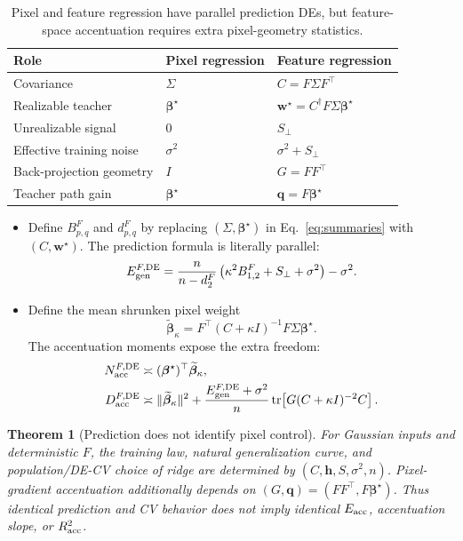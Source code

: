 \documentclass{article}
\newtheorem{theorem}{Theorem}
\providecommand{\tr}{\operatorname{tr}}
\newcommand{\bstar}{\bm\beta^{\star}}
\newcommand{\tstar}{\bm w^{\star}}
\newcommand{\Egen}{E_{\rm gen}}
\newcommand{\Eacc}{E_{\rm acc}}
\newcommand{\Racc}{R_{\rm acc}^{2}}
\newcommand{\Sperp}{S_{\perp}}
\begin{document}
\begin{table}[t]
\caption{Pixel and feature regression have parallel prediction DEs, but
feature-space accentuation requires extra pixel-geometry statistics.}
\label{tab:parallel}
\centering
\small
\begin{tabular}{@{}lll@{}}
\toprule
Role & Pixel regression & Feature regression \\
\midrule
Covariance & $\Sigma$ & $C=F\Sigma F^\top$ \\
Realizable teacher & $\bstar$ & $\tstar=C^\dagger F\Sigma\bstar$ \\
Unrealizable signal & $0$ & $\Sperp$ \\
Effective training noise & $\sigma^2$ & $\sigma^2+\Sperp$ \\
Back-projection geometry & $I$ & $G=FF^\top$ \\
Teacher path gain & $\bstar$ & $\bm q=F\bstar$ \\
\bottomrule
\end{tabular}
\end{table}

\begin{itemize}[leftmargin=1.3em]
  \item Define $B^F_{p,q}$ and $d^F_{p,q}$ by replacing
        $(\Sigma,\bstar)$ in Eq.~\eqref{eq:summaries} with $(C,\tstar)$.
        The prediction formula is literally parallel:
  \begin{equation}
    \Egen^{F,{\rm DE}}
    =\frac{n}{n-d_2^F}
      \left(\kappa^2B^F_{1,2}+\Sperp+\sigma^2\right)-\sigma^2.
    \label{eq:feature-egen}
  \end{equation}
  \item Define the mean shrunken pixel weight
  \begin{equation}
    \widetilde{\bm\beta}_\kappa
    =F^\top(C+\kappa I)^{-1}F\Sigma\bstar.
    \label{eq:betatilde}
  \end{equation}
  The accentuation moments expose the extra freedom:
  \begin{align}
    N_{\rm acc}^{F,{\rm DE}}
    &\asymp (\bstar)^\top\widetilde{\bm\beta}_\kappa,
    \label{eq:feature-n}\\
    D_{\rm acc}^{F,{\rm DE}}
    &\asymp \lVert\widetilde{\bm\beta}_\kappa\rVert^2
    +\frac{\Egen^{F,{\rm DE}}+\sigma^2}{n}
      \tr\!\left[G(C+\kappa I)^{-2}C\right].
    \label{eq:feature-d}
  \end{align}
\end{itemize}

\begin{theorem}[Prediction does not identify pixel control]
\label{thm:separation}
For Gaussian inputs and deterministic $F$, the training law, natural
generalization curve, and population/DE-CV choice of ridge are determined by
$(C,\bm h,S,\sigma^2,n)$. Pixel-gradient accentuation additionally depends on
$(G,\bm q)=(FF^\top,F\bstar)$. Thus identical prediction and CV behavior does
not imply identical $\Eacc$, accentuation slope, or $\Racc$.
\end{theorem}
\end{document}
